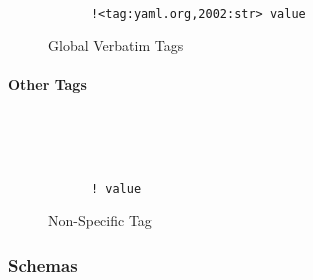 \documentclass[a4paper, svgnames, 12pt]{article}
\begin{document}
\begin{figure}[H]
  \begin{minipage}[t]{0.48\textwidth}
    \vspace{0pt}
    \begin{bchart}[max=9, width=0.85\textwidth]
    \end{bchart}
  \end{minipage}
  \begin{minipage}[t]{0pt}~\end{minipage}
  \begin{minipage}[t]{0.48\textwidth}
    \vspace{0pt}
    \begin{verbatim}
      !<tag:yaml.org,2002:str> value
    \end{verbatim}
  \end{minipage}
  \caption{Global Verbatim Tags}
\end{figure}

\paragraph{Other Tags}~\\

\begin{figure}[H]
  \begin{minipage}[t]{0.48\textwidth}
    \vspace{0pt}
    \begin{bchart}[max=9, width=0.85\textwidth]
    \end{bchart}
  \end{minipage}
  \begin{minipage}[t]{0pt}~\end{minipage}
  \begin{minipage}[t]{0.48\textwidth}
    \vspace{0pt}
    \begin{verbatim}
      ! value
    \end{verbatim}
  \end{minipage}
  \caption{Non-Specific Tag}
\end{figure}

\subsubsection{Schemas}
\end{document}
